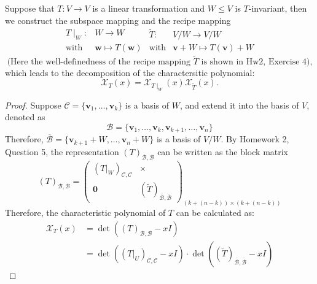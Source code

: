 \begin{proposition}
Suppose that $T:V\to V$ is a linear transformation and 
$W\le V$ is $T$-invariant, then we construct the subspace mapping and the recipe mapping
\begin{subequations}
\begin{equation}
\begin{array}{ll}
T\mid_W:&W\to W\\
\text{with}&\bm w\mapsto T(\bm w)
\end{array}
\end{equation}
\begin{equation}
\begin{array}{ll}
\tilde{T}:&V/W\to V/W\\
\text{with}&\bm v+W\mapsto T(\bm v)+W
\end{array}
\end{equation}
\end{subequations}
\[
\text{(Here the well-definedness of the recipe mapping $\tilde{T}$ is shown in Hw2, Exercise 4),}
\]
which leads to the decomposition of the charactersitic polynomial:
\[
\mathcal{X}_T(x) = \mathcal{X}_{T\mid_W}(x)\mathcal{X}_{\tilde{T}}(x).
\]
\end{proposition}
\begin{proof}
Suppose $\mathcal{C} = \{\bm v_1,\dots,\bm v_k\}$ is a basis of $W$, and extend it into the basis of $V$, denoted as 
\[
\mathcal{B}=\{\bm v_1,\dots,\bm v_k,\bm v_{k+1},\dots,\bm v_n\}
\]
Therefore, $\overline{\mathcal{B}} = \{\bm v_{k+1}+W,\dots,\bm v_n+W\}$ is a basis of $V/W$.
By Homework 2, Question 5, the representation $(T)_{\mathcal{B},\mathcal{B}}$ can be written as the block matrix
\[
(T)_{\mathcal{B},\mathcal{B}} = \begin{pmatrix}
(T|_{W})_{\mathcal{C},\mathcal{C}}&\times\\
\bm0&(\tilde{T})_{\overline{\mathcal{B}},\overline{\mathcal{B}}}
\end{pmatrix}_{(k+(n-k))\times(k+(n-k))}
\]
Therefore, the characteristic polynomial of $T$ can be calculated as:
\begin{align*}
\mathcal{X}_T(x)&= \det((T)_{\mathcal{B},\mathcal{B}} - xI)\\
&=\det((T|_{U})_{\mathcal{C},\mathcal{C}} - xI)\cdot\det((\tilde{T})_{\overline{\mathcal{B}},\overline{\mathcal{B}}} - xI)
\end{align*}
\end{proof}

